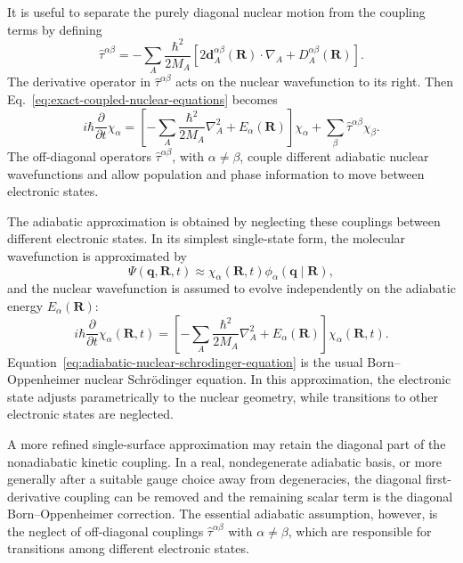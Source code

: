 \documentclass[
  11pt,
  letterpaper,
  onehalfspacing,
  normalmargins,
  equalmargins,
  oneside
]{ut-thesis}
\begin{document}
It is useful to separate the purely diagonal nuclear motion from the coupling
terms by defining
\begin{equation}
\hat \tau^{\alpha\beta}
=
-
\sum_A
\frac{\hbar^2}{2M_A}
\left[
2\mathbf d_A^{\alpha\beta}(\mathbf R)\cdot\nabla_A
+
D_A^{\alpha\beta}(\mathbf R)
\right].
\label{eq:tau-alpha-beta-definition}
\end{equation}
The derivative operator in \(\hat \tau^{\alpha\beta}\) acts on the nuclear
wavefunction to its right. Then Eq.~\eqref{eq:exact-coupled-nuclear-equations}
becomes
\begin{equation}
i\hbar
\frac{\partial}{\partial t}
\chi_\alpha
=
\left[
-\sum_A
\frac{\hbar^2}{2M_A}
\nabla_A^2
+
E_\alpha(\mathbf R)
\right]\chi_\alpha
+
\sum_\beta
\hat \tau^{\alpha\beta}\chi_\beta .
\label{eq:coupled-nuclear-equations-compact}
\end{equation}
The off-diagonal operators \(\hat\tau^{\alpha\beta}\), with
\(\alpha\neq\beta\), couple different adiabatic nuclear wavefunctions and allow
population and phase information to move between electronic states.

The adiabatic approximation is obtained by neglecting these couplings between
different electronic states. In its simplest single-state form, the molecular
wavefunction is approximated by
\begin{equation}
\Psi(\mathbf q,\mathbf R,t)
\approx
\chi_\alpha(\mathbf R,t)
\phi_\alpha(\mathbf q\mid\mathbf R),
\label{eq:adiabatic-product-ansatz}
\end{equation}
and the nuclear wavefunction is assumed to evolve independently on the
adiabatic energy \(E_\alpha(\mathbf R)\):
\begin{equation}
i\hbar
\frac{\partial}{\partial t}
\chi_\alpha(\mathbf R,t)
=
\left[
-\sum_A
\frac{\hbar^2}{2M_A}
\nabla_A^2
+
E_\alpha(\mathbf R)
\right]
\chi_\alpha(\mathbf R,t).
\label{eq:adiabatic-nuclear-schrodinger-equation}
\end{equation}
Equation~\eqref{eq:adiabatic-nuclear-schrodinger-equation} is the usual
Born--Oppenheimer nuclear Schr\"odinger equation. In this approximation, the
electronic state adjusts parametrically to the nuclear geometry, while
transitions to other electronic states are neglected.

A more refined single-surface approximation may retain the diagonal part of
the nonadiabatic kinetic coupling. In a real, nondegenerate adiabatic basis, or
more generally after a suitable gauge choice away from degeneracies, the
diagonal first-derivative coupling can be removed and the remaining scalar term
is the diagonal Born--Oppenheimer correction. The essential adiabatic
assumption, however, is the neglect of off-diagonal couplings
\(\hat\tau^{\alpha\beta}\) with \(\alpha\neq\beta\), which are responsible for
transitions among different electronic states.
\end{document}
